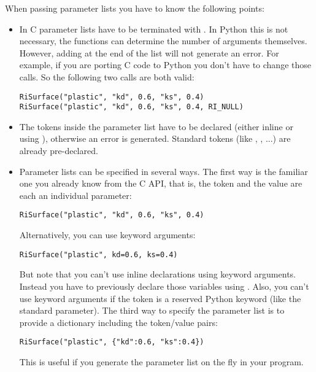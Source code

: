 When passing parameter lists you have to know the following points:

\begin{itemize}
\item In C parameter lists have to be terminated with . In Python
this is not necessary, the functions can determine the number of
arguments themselves. However, adding  at the end of the list
will not generate an error. For example, if you are porting C code to
Python you don't have to change those calls. So the following two
calls are both valid:

\begin{verbatim}
RiSurface("plastic", "kd", 0.6, "ks", 0.4)
RiSurface("plastic", "kd", 0.6, "ks", 0.4, RI_NULL) 
\end{verbatim}

\item The tokens inside the parameter list have to be declared (either
inline or using ), otherwise an error is
generated. Standard tokens (like , , ...) are
already pre-declared.

\item Parameter lists can be specified in several ways. The first way is the
familiar one you already know from the C API, that is, the token and
the value are each an individual parameter:

\begin{verbatim}
RiSurface("plastic", "kd", 0.6, "ks", 0.4) 
\end{verbatim}

Alternatively, you can use keyword arguments: 

\begin{verbatim}
RiSurface("plastic", kd=0.6, ks=0.4) 
\end{verbatim}

But note that you can't use inline declarations using keyword
arguments. Instead you have to previously declare those variables
using . Also, you can't use keyword arguments if
the token is a reserved Python keyword (like the standard 
parameter).  The third way to specify the parameter list is to provide
a dictionary including the token/value pairs:

\begin{verbatim}
RiSurface("plastic", {"kd":0.6, "ks":0.4}) 
\end{verbatim}

This is useful if you generate the parameter list on the fly in your program.

\end{itemize}

